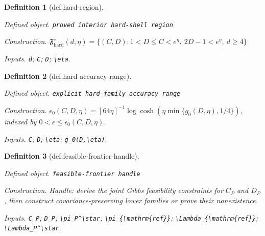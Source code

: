 \documentclass{article}
\newtheorem{definition}{Definition}
\begin{document}
\begin{definition}[def:hard-region]\label{def:hard-region}
\par\smallskip\noindent\emph{Defined object.} \texttt{proved interior hard-\allowbreak{}shell region}
\par\smallskip\noindent\emph{Construction.} \(\mathfrak F_{\mathrm{hard}}^\circ(d,\eta)=\{(C,D):1<D\le C<e^\eta,\ 2D-1<e^\eta,\ d\ge4\}\)
\par\smallskip\noindent\emph{Inputs.} \texttt{d}; \texttt{C}; \texttt{D}; \texttt{\textbackslash{}\allowbreak{}eta}.
\end{definition}

\begin{definition}[def:hard-accuracy-range]\label{def:hard-accuracy-range}
\par\smallskip\noindent\emph{Defined object.} \texttt{explicit hard-\allowbreak{}family accuracy range}
\par\smallskip\noindent\emph{Construction.} \(\epsilon_0(C,D,\eta)=[64\eta]^{-1}\log\cosh(\eta\min\{g_0(D,\eta),1/4\})\), indexed by \(0<\epsilon\le\epsilon_0(C,D,\eta)\).
\par\smallskip\noindent\emph{Inputs.} \texttt{C}; \texttt{D}; \texttt{\textbackslash{}\allowbreak{}eta}; \texttt{g\_\allowbreak{}0(D,\allowbreak{}\textbackslash{}\allowbreak{}eta)}.
\end{definition}

\begin{definition}[def:feasible-frontier-handle]\label{def:feasible-frontier-handle}
\par\smallskip\noindent\emph{Defined object.} \texttt{feasible-\allowbreak{}frontier handle}
\par\smallskip\noindent\emph{Construction.} Handle: derive the joint Gibbs feasibility constraints for \(C_P\) and \(D_P\), then construct covariance-preserving lower families or prove their nonexistence.
\par\smallskip\noindent\emph{Inputs.} \texttt{C\_\allowbreak{}P}; \texttt{D\_\allowbreak{}P}; \texttt{\textbackslash{}\allowbreak{}pi\_\allowbreak{}P\textasciicircum{}\textbackslash{}\allowbreak{}star}; \texttt{\textbackslash{}\allowbreak{}pi\_\allowbreak{}\{\textbackslash{}\allowbreak{}mathrm\{ref\}\allowbreak{}\}\allowbreak{}}; \texttt{\textbackslash{}\allowbreak{}Lambda\_\allowbreak{}\{\textbackslash{}\allowbreak{}mathrm\{ref\}\allowbreak{}\}\allowbreak{}}; \texttt{\textbackslash{}\allowbreak{}Lambda\_\allowbreak{}P\textasciicircum{}\textbackslash{}\allowbreak{}star}.
\end{definition}
\end{document}
